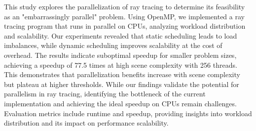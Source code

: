 
This study explores the parallelization of ray tracing to determine its feasibility as an "embarrassingly parallel" problem. Using OpenMP\cite{openmp_spec}, we implemented a ray tracing program that runs in parallel on CPUs, analyzing workload distribution and scalability. Our experiments revealed that static scheduling leads to load imbalances, while dynamic scheduling improves scalability at the cost of overhead. The results indicate suboptimal speedup for smaller problem sizes, achieving a speedup of 77.5 times at high scene complexity with 256 threads. This demonstrates that parallelization benefits increase with scene complexity but plateau at higher thresholds. While our findings validate the potential for parallelism in ray tracing, identifying the bottleneck of the current implementation and achieving the ideal speedup on CPUs remain challenges. Evaluation metrics include runtime and speedup, providing insights into workload distribution and its impact on performance scalability.